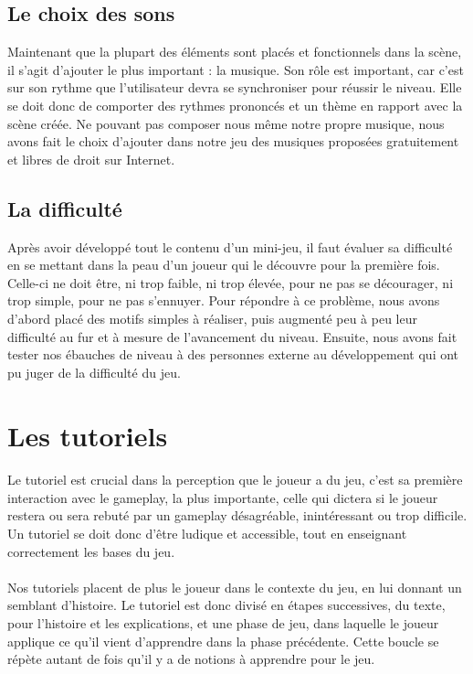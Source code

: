 \subsection{Le choix des sons}

Maintenant que la plupart des éléments sont placés et fonctionnels dans la scène, il s'agit d'ajouter le plus important : la musique. Son rôle est important, car c'est sur son rythme que l'utilisateur devra se synchroniser pour réussir le niveau. Elle se doit donc de comporter des rythmes prononcés et un thème en rapport avec la scène créée.
Ne pouvant pas composer nous même notre propre musique, nous avons fait le choix d'ajouter dans notre jeu des musiques proposées gratuitement et libres de droit sur Internet.

\subsection{La difficulté}

Après avoir développé tout le contenu d'un mini-jeu, il faut évaluer sa difficulté en se mettant dans la peau d'un joueur qui le découvre pour la première fois. Celle-ci ne doit être, ni trop faible, ni trop élevée, pour ne pas se décourager, ni trop simple, pour ne pas s'ennuyer. Pour répondre à ce problème, nous avons d'abord placé des motifs simples à réaliser, puis augmenté peu à peu leur difficulté au fur et à mesure de l'avancement du niveau. Ensuite, nous avons fait tester nos ébauches de niveau à des personnes externe au développement qui ont pu juger de la difficulté du jeu.


\section{Les tutoriels}

\paragraph{}
Le tutoriel est crucial dans la perception que le joueur a du jeu, c'est sa première interaction avec le gameplay, la plus importante, celle qui dictera si le joueur restera ou sera rebuté par un gameplay désagréable, inintéressant ou trop difficile. Un tutoriel se doit donc d'être ludique et accessible, tout en enseignant correctement les bases du jeu.

\paragraph{}
Nos tutoriels placent de plus le joueur dans le contexte du jeu, en lui donnant un semblant d'histoire. Le tutoriel est donc divisé en étapes successives, du texte, pour l'histoire et les explications, et une phase de jeu, dans laquelle le joueur applique ce qu'il vient d'apprendre dans la phase précédente. Cette boucle se répète autant de fois qu'il y a de notions à apprendre pour le jeu.

